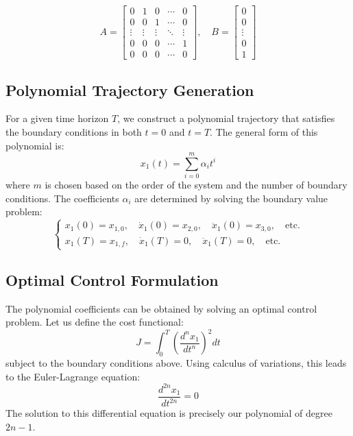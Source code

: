 \documentclass[12pt]{article}
\begin{document}
\begin{equation}
    A = \begin{bmatrix} 
    0 & 1 & 0 & \cdots & 0 \\
    0 & 0 & 1 & \cdots & 0 \\
    \vdots & \vdots & \vdots & \ddots & \vdots \\
    0 & 0 & 0 & \cdots & 1 \\
    0 & 0 & 0 & \cdots & 0
    \end{bmatrix}, \quad 
    B = \begin{bmatrix} 0 \\ 0 \\ \vdots \\ 0 \\ 1 \end{bmatrix}
\end{equation}

\subsection{Polynomial Trajectory Generation}
For a given time horizon $T$, we construct a polynomial trajectory that satisfies the boundary conditions in both $t=0$ and $t=T$. The general form of this polynomial is:
\begin{equation}
    x_1(t) = \sum_{i=0}^{m} \alpha_i t^i
\end{equation}
where $m$ is chosen based on the order of the system and the number of boundary conditions. The coefficients $\alpha_i$ are determined by solving the boundary value problem:
\begin{equation}
    \begin{cases}
    x_1(0) = x_{1,0}, \quad \dot{x}_1(0) = x_{2,0}, \quad \ddot{x}_1(0) = x_{3,0}, \quad \text{etc.} \\
    x_1(T) = x_{1,f}, \quad \dot{x}_1(T) = 0, \quad \ddot{x}_1(T) = 0, \quad \text{etc.}
    \end{cases}
\end{equation}

\subsection{Optimal Control Formulation}
The polynomial coefficients can be obtained by solving an optimal control problem. Let us define the cost functional:
\begin{equation}
    J = \int_0^T \left(\frac{d^nx_1}{dt^n}\right)^2 dt
\end{equation}
subject to the boundary conditions above. Using calculus of variations, this leads to the Euler-Lagrange equation:
\begin{equation}
    \frac{d^{2n}x_1}{dt^{2n}} = 0
\end{equation}
The solution to this differential equation is precisely our polynomial of degree $2n-1$.
\end{document}
